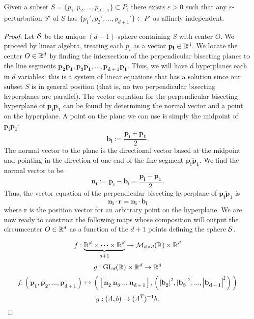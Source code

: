 \documentclass[letterpaper,titlepage]{article}
\begin{document}
    \begin{lem}\label{affine_indep_lemma}
        Given a subset $S= \{p_1,p_2,\dots,p_{d+1}\} \subset P$, there exists $\varepsilon>0$ such that any $\varepsilon$-perturbation $S'$ of $S$ has $\{p_1',p_2',\dots,p_{d+1}'\} \subset P'$ as affinely independent.
    \end{lem}
    \begin{proof}
        Let $\mathcal{S}$ be the unique $(d-1)$-sphere containing $S$ with center $O$. We proceed by linear algebra, treating each $p_i$ as a vector $\mathbf{p_i} \in \mathbb{R}^d$. We locate the center $O \in \mathbb{R}^d$ by finding the intersection of the perpendicular bisecting planes to the line segments $\overline{\mathbf{p_2}\mathbf{p_1}}, \overline{\mathbf{p_3}\mathbf{p_1}}, \dots, \overline{\mathbf{p_{d+1}}\mathbf{p_1}}$. Thus, we will have $d$ hyperplanes each in $d$ variables: this is a system of linear equations that has a solution since our subset $S$ is in general position (that is, no two perpendicular bisecting hyperplanes are parallel). The vector equation for the perpendicular bisecting hyperplane of $\overline{\mathbf{p_i}\mathbf{p_1}}$ can be found by determining the normal vector and a point on the hyperplane. A point on the plane we can use is simply the midpoint of $\overline{\mathbf{p_i}\mathbf{p_1}}$:
        $$\mathbf{b_i} := \frac{\mathbf{p_i}+\mathbf{p_1}}{2}.$$
        The normal vector to the plane is the directional vector based at the midpoint and pointing in the direction of one end of the line segment $\overline{\mathbf{p_i}\mathbf{p_1}}$. We find the normal vector to be
        $$\mathbf{n_i} := \mathbf{p_i}-\mathbf{b_i} = \frac{\mathbf{p_i}-\mathbf{p_1}}{2}.$$
        Thus, the vector equation of the perpendicular bisecting hyperplane of $\overline{\mathbf{p_i}\mathbf{p_1}}$ is
        $$\mathbf{n_i}\cdot \mathbf{r}=\mathbf{n_i}\cdot\mathbf{b_i}$$
        where $\mathbf{r}$ is the position vector for an arbitrary point on the hyperplane.
        \newline
        We are now ready to construct the following maps whose composition will output the circumcenter $O \in \mathbb{R}^d$ as a function of the $d+1$ points defining the sphere $\mathcal{S}$.

        $$f:\underbrace{\mathbb{R}^d \times \dots \times \mathbb{R}^d}_{d+1} \to \mathcal{M}_{d\times d}(\mathbb{R})\times \mathbb{R}^d$$
        $$g:\text{GL}_d(\mathbb{R})\times \mathbb{R}^d \to \mathbb{R}^d$$
        $$f:(\mathbf{p_1},\mathbf{p_2},\dots,\mathbf{p_{d+1}}) \mapsto \left(\left[\mathbf{n_2}\ \mathbf{n_3}\ \dots\ \mathbf{n_{d+1}}\right],\left(\left|\mathbf{b_2}\right|^2, \left|\mathbf{b_3}\right|^2,\dots,\left|\mathbf{b_{d+1}}\right|^2\right)\right)$$
        $$g:(A,b) \mapsto (A^T)^{-1} b.$$


\end{proof}
\end{document}
